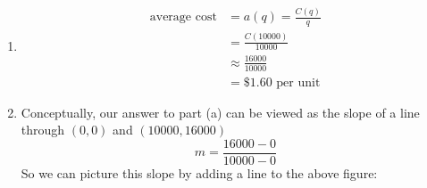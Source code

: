 \documentclass[oneside]{book}
\theoremstyle{definition}
\theoremstyle{solution}
\newtheorem*{solution}{Solution}
\newenvironment{solution}{\vspace{2in}\comment}{\endcomment}
\begin{document}
\begin{solution}
\begin{enumerate}
\item \begin{align*}
\text{average cost} & = a(q) = \frac{C(q)}{q}\\
  & = \frac{C(10000)}{10000}\\
  & \approx \frac{16000}{10000}\\
  & = \$1.60 \text{ per unit}
\end{align*}

\item Conceptually, our answer to part (a) can be viewed as the slope
  of a line through $(0,0)$ and $(10000,16000)$
$$
m= \frac{16000-0}{10000-0}
$$
So we can picture this slope by adding a line to the above figure:
\begin{center}
\end{center}


\end{enumerate}
\end{solution}
\end{document}
